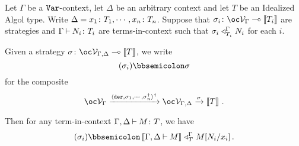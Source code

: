 \documentclass[11pt]{report}
\begin{document}
\begin{lemma}
  Let $\Gamma$ be a ${\mathtt{Var}}$-context, let $\Delta$ be an arbitrary context and let $T$ be an Idealized Algol type.
  Write $\Delta=x_1\colon T_1,\cdots,x_n\colon T_n$.  
  Suppose that $\sigma_i\from \oc\V_\Gamma \implies \deno{T_i}$ are strategies and $\Gamma\mathbin{\vdash} N_i\colon T_i$ are terms-in-context such that $\sigma_i\mathrel{\triangleleft}_{T_i}^\Gamma N_i$ for each $i$.  

  Given a strategy $\sigma\from \oc\V_{\Gamma,\Delta}\implies \deno{T}$, we write
  \[
    (\sigma_i)\semicom \sigma
    \]
  for the composite
  \[
    \oc\V_\Gamma \xrightarrow{\langle \der,\sigma_1,\cdots,\sigma_n^\dag\rangle^\dag} \oc\V_{\Gamma,\Delta} \xrightarrow{\sigma} \deno{T}\,.
    \]

  Then for any term-in-context $\Gamma,\Delta \mathbin{\vdash} M\colon T$, we have
  \[
    (\sigma_i)\semicom\deno{\Gamma,\Delta\ts M} \plot_T^{\Gamma} M[N_i/x_i]\,.
    \]
  \label{LemAdequacy}
\end{lemma}
\end{document}
